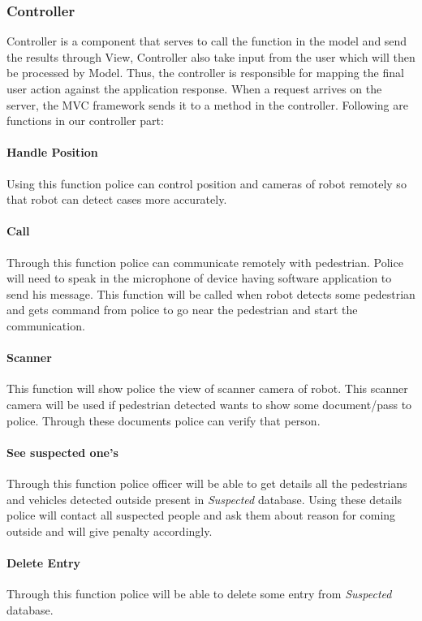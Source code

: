 \documentclass[10pt,twocolumn,letterpaper]{article}
\begin{document}
\subsubsection{Controller}
Controller is a component that serves to call the function in the model and send the results through View, Controller also take input from the user which will then be processed by Model. Thus, the controller is responsible for mapping the final user action against the application response. When a request arrives on the server, the MVC framework sends it to a method in the controller. Following are functions in our controller part:
\paragraph{Handle Position} Using this function police can control position and cameras of robot remotely so that robot can detect cases more accurately.
\paragraph{Call} Through this function police can communicate remotely with pedestrian. Police will need to speak in the microphone of device having software application to send his message. This function will be called when robot detects some pedestrian and gets command from police to go near the pedestrian and start the communication.
\paragraph{Scanner} This function will show police the view of scanner camera of robot. This scanner camera will be used if pedestrian detected wants to show some document/pass to police. Through these documents police can verify that person.
\paragraph{See suspected one's} Through this function police officer will be able to get details all the pedestrians and vehicles detected outside present in \emph{Suspected} database. Using these details police will contact all suspected people and ask them about reason for coming outside and  will give penalty accordingly.

\paragraph{Delete Entry} Through this function police will be able to delete some entry from \emph{Suspected} database.
\end{document}
